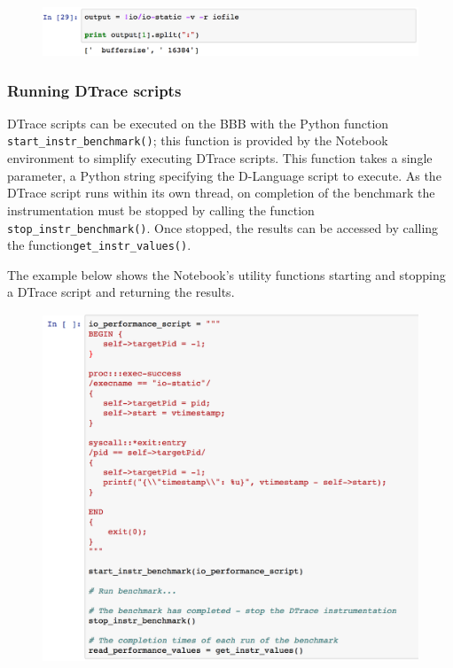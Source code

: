 \documentclass[a4paper,10pt]{article}
\begin{document}
{\begin{figure}[H]
\includegraphics[width=\linewidth]{jupyter_running_benchmark_capture.png}
\end{figure}

\subsubsection*{Running DTrace scripts}

DTrace scripts can be executed on the BBB with the Python function
\texttt{start\_instr\_benchmark()}; this function is provided by the Notebook
environment to simplify executing DTrace scripts. This function takes a single
parameter, a Python string specifying the D-Language script to execute.  As the
DTrace script runs within its own thread, on completion of the benchmark the
instrumentation must be stopped by calling the function
\texttt{stop\_instr\_benchmark()}. Once stopped, the results can be accessed by
calling the function\newline \texttt{get\_instr\_values()}.

The example below shows the Notebook's utility functions starting and stopping
a DTrace script and returning the results.

\begin{figure}[H]
\includegraphics[width=\linewidth]{jupyter_dtrace_utils.png}
\end{figure}

}
\end{document}
